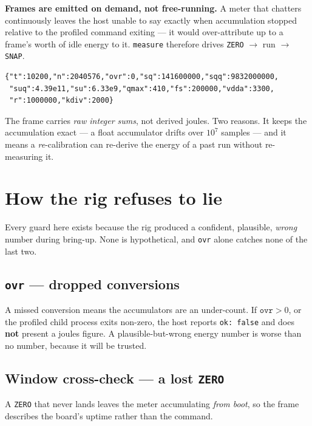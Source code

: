 \documentclass[11pt,a4paper]{article}
\begin{document}
\medskip
\noindent
\textbf{Frames are emitted on demand, not free-running.} A meter that chatters continuously leaves
the host unable to say exactly when accumulation stopped relative to the profiled command exiting
--- it would over-attribute up to a frame's worth of idle energy to it. \texttt{measure} therefore
drives \texttt{ZERO} $\rightarrow$ run $\rightarrow$ \texttt{SNAP}.

\begin{verbatim}
{"t":10200,"n":2040576,"ovr":0,"sq":141600000,"sqq":9832000000,
 "suq":4.39e11,"su":6.33e9,"qmax":410,"fs":200000,"vdda":3300,
 "r":1000000,"kdiv":2000}
\end{verbatim}

\noindent
The frame carries \emph{raw integer sums}, not derived joules. Two reasons. It keeps the
accumulation exact --- a float accumulator drifts over $10^7$ samples --- and it means a
\emph{re}-calibration can re-derive the energy of a past run without re-measuring it.

\section{How the rig refuses to lie}
\label{sec:honesty}

Every guard here exists because the rig produced a confident, plausible, \emph{wrong} number
during bring-up. None is hypothetical, and \texttt{ovr} alone catches none of the last two.

\subsection{\texttt{ovr} --- dropped conversions}

A missed conversion means the accumulators are an under-count. If $\texttt{ovr} > 0$, or the
profiled child process exits non-zero, the host reports \texttt{ok: false} and does \textbf{not}
present a joules figure. A plausible-but-wrong energy number is worse than no number, because it
will be trusted.

\subsection{Window cross-check --- a lost \texttt{ZERO}}

A \texttt{ZERO} that never lands leaves the meter accumulating \emph{from boot}, so the frame
describes the board's uptime rather than the command.
\end{document}

